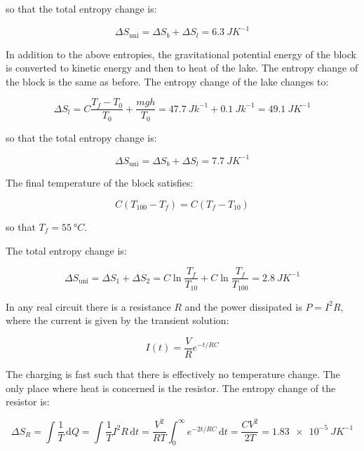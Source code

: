 \documentclass[12pt]{article}
\begin{document}
so that the total entropy change is:

\begin{equation}
    \Delta S_{\text{uni}} = \Delta S_{b} + \Delta S_{l} = \qty{6.3}{JK^{-1}}
\end{equation}

In addition to the above entropies, the gravitational potential energy of the block is converted to kinetic energy and then to heat of the lake. The entropy change of the block is the same as before. The entropy change of the lake changes to:

\begin{equation}
    \Delta S_{l} =C \frac{T_{f} - T_{0}}{T_{0}} + \frac{mgh}{T_{0}} = \qty{47.7}{Jk^{-1}} + \qty{0.1}{Jk^{-1}} = \qty{49.1}{JK^{-1}}
\end{equation}

so that the total entropy change is:

\begin{equation}
    \Delta S_{\text{uni}} = \Delta S_{b} + \Delta S_{l} = \qty{7.7}{JK^{-1}}
\end{equation}

The final temperature of the block satisfies:

\begin{equation}
    C(T_{100} - T_{f}) = C(T_{f} - T_{10})
\end{equation}

so that $T_{f} = \qty{55}{\degree C}$.

The total entropy change is:

\begin{equation}
    \Delta S_{\text{uni}} = \Delta S_{1} + \Delta S_{2} = C \ln{\frac{T_{f}}{T_{10}}} + C \ln{\frac{T_{f}}{T_{100}}} = \qty{2.8}{JK^{-1}}
\end{equation}

In any real circuit there is a resistance $R$ and the power dissipated is $P = I^{2}R$, where the current is given by the transient solution:

\begin{equation}
    I(t) = \frac{V}{R} e^{-t/RC}
\end{equation}


The charging is fast such that there is effectively no temperature change. The only place where heat is concerned is the resistor. The entropy change of the resistor is:

\begin{equation}
    \Delta S_{R} = \int \frac{1}{T} \, \mathrm{d}Q = \int \frac{1}{T} I^{2} R \, \mathrm{d}t = \frac{V^{2}}{RT} \int_{0}^{\infty} e^{-2t/RC} \, \mathrm{d}t = \frac{CV^{2}}{2T} = \qty{1.83e-5}{JK^{-1}}
\end{equation}
\end{document}

